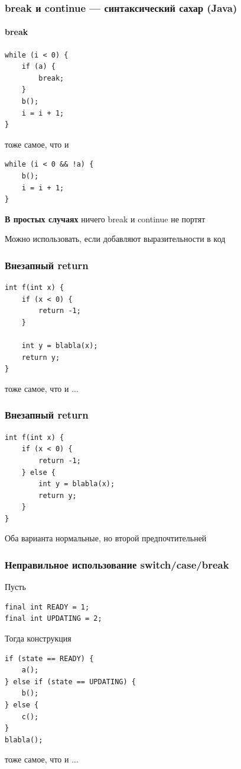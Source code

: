 {\begin{frame}[fragile]
  \frametitle{break и continue --- синтаксический сахар (Java)}
  \framesubtitle{break}
  \begin{verbatim}
while (i < 0) {
    if (a) {
        break;
    }
    b();
    i = i + 1;
}
  \end{verbatim}
тоже самое, что и
  \begin{verbatim}
while (i < 0 && !a) {
    b();
    i = i + 1;
}
  \end{verbatim}

  \textbf{В простых случаях} ничего break и continue не портят

  Можно использовать, если добавляют выразительности в код
\end{frame}

\begin{frame}[fragile]
  \frametitle{Внезапный return}
  \begin{verbatim}
int f(int x) {
    if (x < 0) {
        return -1;
    }

    int y = blabla(x);
    return y;
}
  \end{verbatim}

тоже самое, что и ...
\end{frame}

\begin{frame}[fragile]
  \frametitle{Внезапный return}
  \begin{verbatim}
int f(int x) {
    if (x < 0) {
        return -1;
    } else {
        int y = blabla(x);
        return y;
    }
}
  \end{verbatim}

  Оба варианта нормальные, но второй предпочтительней
\end{frame}

\begin{frame}[fragile]
  \frametitle{Неправильное использование \textbf{switch}/\textbf{case}/\textbf{break}}
Пусть
  \begin{verbatim}
final int READY = 1;
final int UPDATING = 2;
  \end{verbatim}

Тогда конструкция
  \begin{verbatim}
if (state == READY) {
    a();
} else if (state == UPDATING) {
    b();
} else {
    c();
}
blabla();
  \end{verbatim}

тоже самое, что и ...
\end{frame}

}

